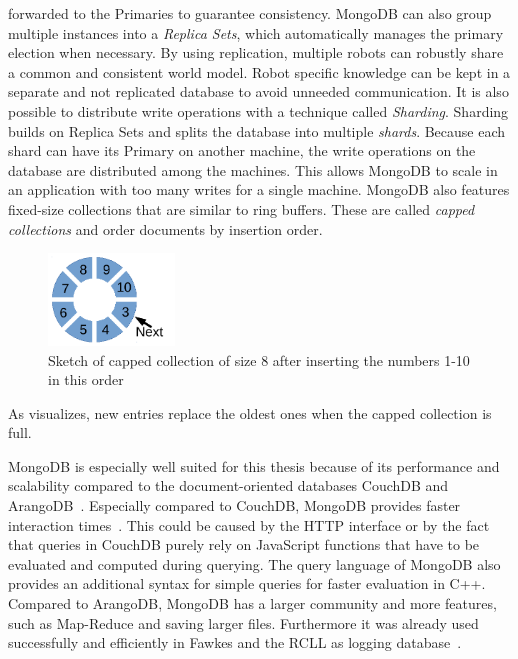 forwarded to the Primaries to guarantee consistency.  MongoDB can also
group multiple instances into a \emph{Replica Sets}, which
automatically manages the primary election when necessary. By using
replication, multiple robots can robustly share a common and
consistent world model. Robot specific knowledge can be kept in a
separate and not replicated database to avoid unneeded
communication. It is also possible to distribute write operations with
a technique called \emph{Sharding}. Sharding builds on Replica Sets
and splits the database into multiple \emph{shards}. Because each
shard can have its Primary on another machine, the write operations on
the database are distributed among the machines. This allows MongoDB
to scale in an application with too many writes for a single
machine. MongoDB also features fixed-size collections that are similar
to ring buffers. These are called \emph{capped collections} and order
documents by insertion order.
\begin{figure}
  \centering
  \includegraphics[width=0.3\textwidth]{draw/capped-collection}%
  \caption[Sketch of capped collection of size 8 after inserting the numbers 1-10 in
  this order]{Sketch of capped collection of size 8 after inserting the numbers 1-10 in
  this order}
  \vspace{-3mm}
  \label{fig:capped-collection}
\end{figure}
As 
visualizes, new entries replace the oldest ones when the capped
collection is full.

MongoDB is especially well suited for this thesis because of its
performance and scalability compared to the document-oriented
databases CouchDB and
ArangoDB~\cite{arango-vs-mongo}. Especially compared to
CouchDB, MongoDB provides faster interaction times~\cite{db-comparison}. This could be
caused by the HTTP interface or by the fact that queries in CouchDB purely rely on JavaScript
functions that have to be evaluated and computed during querying. The
query language of MongoDB also provides an additional syntax for
simple queries for faster evaluation in C++. Compared to ArangoDB,
MongoDB has a larger community and more features, such as Map-Reduce
and saving larger files. Furthermore it was already used successfully
and efficiently in Fawkes and the RCLL as logging
database~\cite{RoboDB,RCLL2015Eval}.


